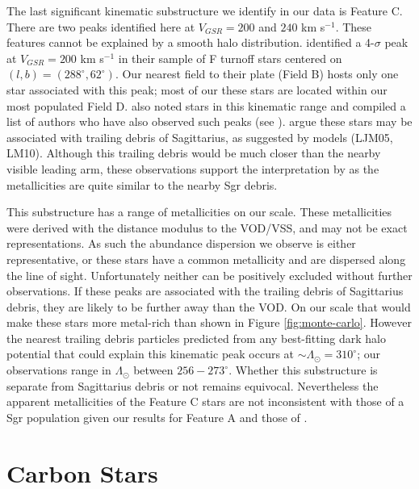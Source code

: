\documentclass[preprint2]{aastex}
\begin{document}
	The last significant kinematic substructure we identify in our data is Feature C. There are two peaks identified here at $V_{GSR} = 200$ and $240$ km s$^{-1}$. These features cannot be explained by a smooth halo distribution. \citet{Newberg;et-al_2007} identified a 4-$\sigma$ peak at $V_{GSR} = 200$ km s$^{-1}$ in their sample of F turnoff stars centered on $(l, b) = (288^\circ, 62^\circ)$. Our nearest field to their plate (Field B) hosts only one star associated with this peak; most of our these stars are located within our most populated Field D. \citet{Prior;et-al_2009b} also noted stars in this kinematic range and compiled a list of authors who have also observed such peaks (see \citet{Sirko;et-al_2004, Duffau;et-al_2006, Starkenburg;et-al_2009}). \citet{Prior;et-al_2009b} argue these stars may be associated with trailing debris of Sagittarius, as suggested by models (LJM05, LM10).  Although this trailing debris would be much closer than the nearby visible leading arm, these observations support the interpretation by \citet{Prior;et-al_2009b} as the metallicities are quite similar to the nearby Sgr debris.
	
	This substructure has a range of metallicities on our scale. These metallicities were derived with the distance modulus to the VOD/VSS, and may not be exact representations. As such the abundance dispersion we observe is either representative, or these stars have a common metallicity and are dispersed along the line of sight. Unfortunately neither can be positively excluded without further observations. If these peaks are associated with the trailing debris of Sagittarius debris, they are likely to be further away than the VOD. On our scale that would make these stars more metal-rich than shown in Figure \ref{fig:monte-carlo}. However the nearest trailing debris particles predicted from any best-fitting dark halo potential that could explain this kinematic peak occurs at $\sim\Lambda_\odot = 310^\circ$; our observations range in $\Lambda_\odot$ between $256-273^\circ$. Whether this substructure is separate from Sagittarius debris or not remains equivocal. Nevertheless the apparent metallicities of the Feature C stars are not inconsistent with those of a Sgr population given our results for Feature A and those of \citet{Keller;Yong;Da_Costa_2010}.
	
\section{Carbon Stars}
	
\end{document}
